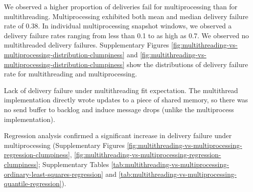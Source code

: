 We observed a higher proportion of deliveries fail for multiprocessing than for multithreading.
Multiprocessing exhibited both mean and median delivery failure rate of 0.38.
In individual multiprocessing snapshot windows, we observed a delivery failure rates ranging from less than 0.1 to as high as 0.7.
We observed no multithreaded delivery failures.
Supplementary Figures \ref{fig:multithreading-vs-multiprocessing-distribution-clumpiness} and \ref{fig:multithreading-vs-multiprocessing-distribution-clumpiness} show the distributions of delivery failure rate for multithreading and multiprocessing.

Lack of delivery failure under multithreading fit expectation.
The multithread implementation directly wrote updates to a piece of shared memory, so there was no send buffer to backlog and induce message drops (unlike the multiprocess implementation).

Regression analysis confirmed a significant increase in delivery failure under multiprocessing (Supplementary Figures \ref{fig:multithreading-vs-multiprocessing-regression-clumpiness}, \ref{fig:multithreading-vs-multiprocessing-regression-clumpiness}; Supplementary Tables \ref{tab:multithreading-vs-multiprocessing-ordinary-least-squares-regression} and \ref{tab:multithreading-vs-multiprocessing-quantile-regression}).
